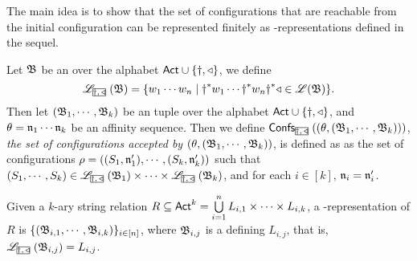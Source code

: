 The main idea is to show that the set of configurations that are reachable from the initial configuration can be represented finitely as {\WOTrNFA}-representations defined in the sequel. 

Let ${\mathfrak{B} }$ be an {\WOTrNFA} over the alphabet ${\sf Act}\cup\{\dag, \triangleleft\}$, we define 
$$\Lang_{\mhcancel{\dag, \triangleleft}}(\AutB) = \{w_1\cdots w_n\mid \dag^*w_1\cdots\dag^*w_n\dag^*\triangleleft\in\Lang(\AutB)\}.$$
Then let $({\mathfrak{B} }_1,\cdots,{\mathfrak{B} }_k)$ be an {\WOTrNFA} tuple over the alphabet ${\sf Act}\cup\{\dag, \triangleleft\}$, 
and $\theta = \mathfrak{n}_1\cdots\mathfrak{n}_k$ be an affinity sequence. Then we define $\confs_{\mhcancel{\dag,\triangleleft}}((\theta, (\AutB_1,\cdots,\AutB_k)))$, \emph{the set of configurations accepted by $(\theta, ({\mathfrak{B} }_1,\cdots,{\mathfrak{B} }_k))$}, is defined as as the set of configurations $\rho = ((S_1,\mathfrak{n}'_1),\cdots,(S_k,\mathfrak{n}'_k))$  such that $(S_1, \cdots, S_k) \in \Lang_{\mhcancel{\dag,\triangleleft}}(\AutB_1)\times\cdots\times\Lang_{\mhcancel{\dag,\triangleleft}}(\AutB_k)$, and for each $i \in [k]$, $\mathfrak{n}_i=\mathfrak{n}_i'$.

\begin{definition}
    Given a $k$-ary string relation $R\subseteq{\sf Act}^k = \bigcup \limits_{i =1 }^n L_{i,1} \times \cdots \times L_{i, k}$, a {\WOTrNFA}-representation of $R$ is $\{({\mathfrak{B} }_{i,1},\cdots,{\mathfrak{B} }_{i,k})\}_{i\in[n]}$, where ${\mathfrak{B} }_{i,j}$ is a {\WOTrNFA} defining $L_{i,j}$, that is, $\Lang_{\mhcancel{\dag,\triangleleft}}(\AutB_{i,j}) = L_{i,j}$.
\end{definition}

